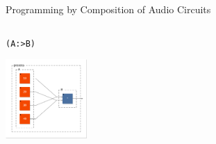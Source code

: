 \begin{frame}[fragile]{Programming by Composition of Audio Circuits}
\begin{columns}
\begin{center}
\lstinline'(A:>B)'

\includegraphics[height=3cm]{images/merge1}
\end{center}
\end{columns}



\end{frame}


